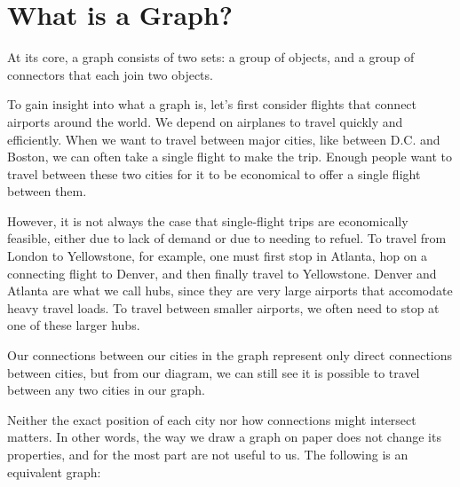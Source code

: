 \documentclass[11pt]{article}
\begin{document}
\section{What is a Graph?}

At its core, a graph consists of two sets: a group of objects, and a group of connectors that each join two objects.

To gain insight into what a graph is, let's first consider flights that connect airports around the world.
We depend on airplanes to travel quickly and efficiently. When we want to travel between major cities,
like between D.C. and Boston, we can often take a single flight to make the trip. Enough people want to travel between
these two cities for it to be economical to offer a single flight between them.

However, it is not always the case that single-flight trips are economically feasible, either due to lack of demand
or due to needing to refuel. To travel from London to Yellowstone, for example, one must first stop in Atlanta, hop
on a connecting flight to Denver, and then finally travel to Yellowstone. Denver and Atlanta are what we call
hubs, since they are very large airports that accomodate heavy travel loads. To travel between smaller airports, we often
need to stop at one of these larger hubs.

\begin{center}
\end{center}

Our connections between our cities in the graph represent only direct connections between
cities, but from our diagram, we can still see it is possible to travel between any two
cities in our graph.

Neither the exact position of each city nor how connections might intersect 
matters. In other words, the way we draw a graph on paper does not change its properties, and for the most part
are not useful to us. The following is an equivalent graph:
\end{document}
